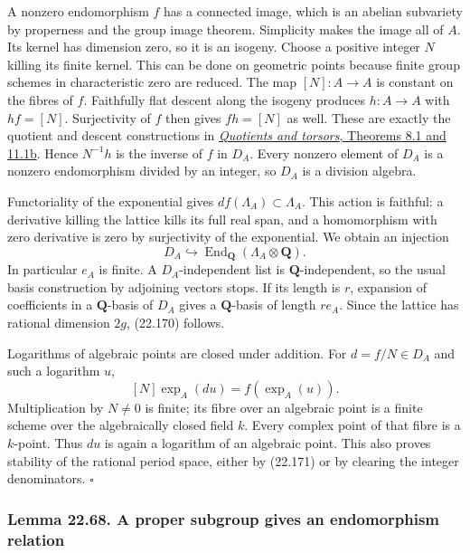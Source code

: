 \documentclass[
  11pt,
  a4paper,
]{article}
\begin{document}
A nonzero endomorphism \(f\) has a connected image, which is an abelian
subvariety by properness and the group image theorem. Simplicity makes
the image all of \(A\). Its kernel has dimension zero, so it is an
isogeny. Choose a positive integer \(N\) killing its finite kernel. This
can be done on geometric points because finite group schemes in
characteristic zero are reduced. The map \([N]:A\to A\) is constant on
the fibres of \(f\). Faithfully flat descent along the isogeny produces
\(h:A\to A\) with \(hf=[N]\). Surjectivity of \(f\) then gives
\(fh=[N]\) as well. These are exactly the quotient and descent
constructions in
\href{https://kokunoyumeto.github.io/open-math-courses-public/courses/AG-GS/AG-GS-04.html\#11-categorical-and-geometric-quotients}{\emph{Quotients
and torsors}, Theorems 8.1 and 11.1b}. Hence \(N^{-1}h\) is the inverse
of \(f\) in \(D_A\). Every nonzero element of \(D_A\) is a nonzero
endomorphism divided by an integer, so \(D_A\) is a division algebra.

Functoriality of the exponential gives
\(df(\Lambda_A)\subset\Lambda_A\). This action is faithful: a derivative
killing the lattice kills its full real span, and a homomorphism with
zero derivative is zero by surjectivity of the exponential. We obtain an
injection \[
 D_A\hookrightarrow
 \operatorname{End}_{\mathbf Q}(\Lambda_A\otimes\mathbf Q).
 \tag{22.171}
\] In particular \(e_A\) is finite. A \(D_A\)-independent list is
\(\mathbf Q\)-independent, so the usual basis construction by adjoining
vectors stops. If its length is \(r\), expansion of coefficients in a
\(\mathbf Q\)-basis of \(D_A\) gives a \(\mathbf Q\)-basis of length
\(r e_A\). Since the lattice has rational dimension \(2g\), (22.170)
follows.

Logarithms of algebraic points are closed under addition. For
\(d=f/N\in D_A\) and such a logarithm \(u\), \[
 [N]\exp_A(du)=f(\exp_A(u)).
 \tag{22.172}
\] Multiplication by \(N\ne0\) is finite; its fibre over an algebraic
point is a finite scheme over the algebraically closed field \(k\).
Every complex point of that fibre is a \(k\)-point. Thus \(du\) is again
a logarithm of an algebraic point. This also proves stability of the
rational period space, either by (22.171) or by clearing the integer
denominators. \(\square\)

\subsubsection{Lemma 22.68. A proper subgroup gives an endomorphism
relation}\label{lemma-22.68.-a-proper-subgroup-gives-an-endomorphism-relation}
\end{document}
